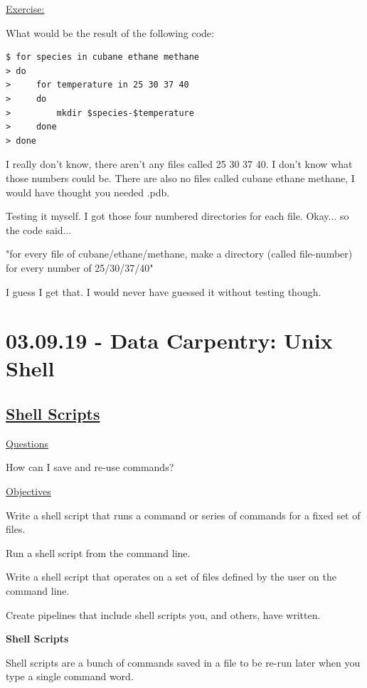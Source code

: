 \documentclass[12pt]{article}
\begin{document}
\begin{addmargin}[1cm]{0cm}
\color{gray}
\underline{Exercise:}

What would be the result of the following code:
\vspace{-1em}\begin{verbatim}
$ for species in cubane ethane methane
> do
>     for temperature in 25 30 37 40
>     do
>         mkdir $species-$temperature
>     done
> done
\end{verbatim}\vspace{-0.5em}
\color{black}
I really don't know, there aren't any files called 25 30 37 40. I don't know what those numbers could be. There are also no files called cubane ethane methane, I would have thought you needed .pdb. 

Testing it myself. I got those four numbered directories for each file. Okay... so the code said...

"for every file of cubane/ethane/methane, make a directory (called file-number) for every number of 25/30/37/40"

I guess I get that. I would never have guessed it without testing though.
\end{addmargin}

\newpage\section{03.09.19 - Data Carpentry: Unix Shell}
\subsection{\href{http://swcarpentry.github.io/shell-novice/06-script/index.html}{\textbf{Shell Scripts}}}
\color{gray}
\underline{Questions}

How can I save and re-use commands?

\underline{Objectives}

Write a shell script that runs a command or series of commands for a fixed set of files.

Run a shell script from the command line.

Write a shell script that operates on a set of files defined by the user on the command line.

Create pipelines that include shell scripts you, and others, have written.
\color{black}

\vspace{1em}
\textbf{Shell Scripts}

Shell scripts are a bunch of commands saved in a file to be re-run later when you type a single command word. 
\end{document}
